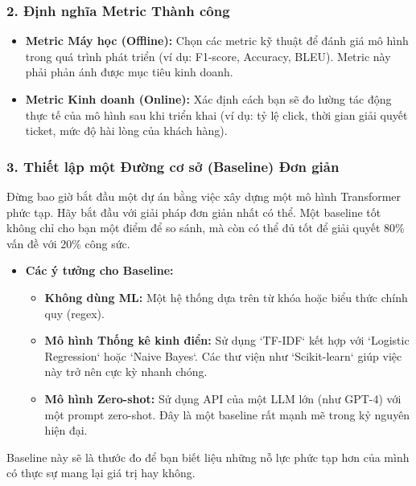 \subsubsection{2. Định nghĩa Metric Thành công}
\begin{itemize}
    \item \textbf{Metric Máy học (Offline):} Chọn các metric kỹ thuật để đánh giá mô hình trong quá trình phát triển (ví dụ: F1-score, Accuracy, BLEU). Metric này phải phản ánh được mục tiêu kinh doanh.
    \item \textbf{Metric Kinh doanh (Online):} Xác định cách bạn sẽ đo lường tác động thực tế của mô hình sau khi triển khai (ví dụ: tỷ lệ click, thời gian giải quyết ticket, mức độ hài lòng của khách hàng).
\end{itemize}

\subsubsection{3. Thiết lập một Đường cơ sở (Baseline) Đơn giản}
\begin{tcolorbox}[
    title=Lời khuyên quan trọng: Bắt đầu một cách "ngu ngốc",
    colback=yellow!10!white, colframe=yellow!50!black, fonttitle=\bfseries
]
Đừng bao giờ bắt đầu một dự án bằng việc xây dựng một mô hình Transformer phức tạp. Hãy bắt đầu với giải pháp đơn giản nhất có thể. Một baseline tốt không chỉ cho bạn một điểm để so sánh, mà còn có thể đủ tốt để giải quyết 80\% vấn đề với 20\% công sức.
\end{tcolorbox}
\begin{itemize}
    \item \textbf{Các ý tưởng cho Baseline:}
        \begin{itemize}
            \item \textbf{Không dùng ML:} Một hệ thống dựa trên từ khóa hoặc biểu thức chính quy (regex).
            \item \textbf{Mô hình Thống kê kinh điển:} Sử dụng `TF-IDF` kết hợp với `Logistic Regression` hoặc `Naive Bayes`. Các thư viện như `Scikit-learn` giúp việc này trở nên cực kỳ nhanh chóng.
            \item \textbf{Mô hình Zero-shot:} Sử dụng API của một LLM lớn (như GPT-4) với một prompt zero-shot. Đây là một baseline rất mạnh mẽ trong kỷ nguyên hiện đại.
        \end{itemize}
\end{itemize}

Baseline này sẽ là thước đo để bạn biết liệu những nỗ lực phức tạp hơn của mình có thực sự mang lại giá trị hay không.

